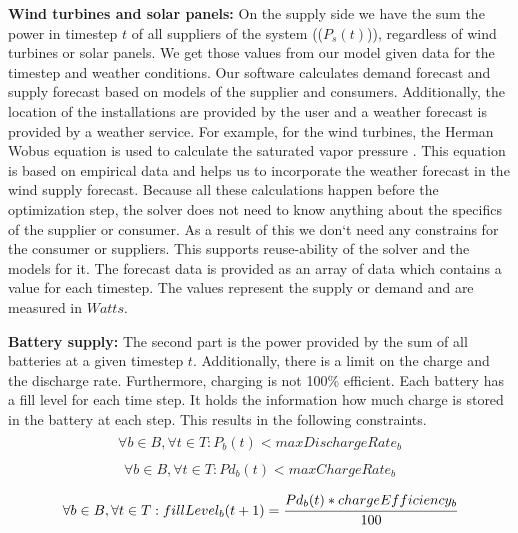 \textbf{Wind turbines and solar panels:} On the supply side we have the sum the power in timestep $t$ of all suppliers of the system (($P_{s}(t)$)), regardless of wind turbines or solar panels.
We get those values from our model given data for the timestep and weather conditions. 
Our software calculates demand forecast and supply forecast based on models of the supplier and consumers. 
Additionally, the location of the installations are provided by the user and a weather forecast is provided by a weather service. 
For example, for the wind turbines, the Herman Wobus equation is used to calculate the saturated vapor pressure \cite{NOAA}. 
This equation is based on empirical data and helps us to incorporate the weather forecast in the wind supply forecast. 
Because all these calculations happen before the optimization step, the solver does not need to know anything about the specifics of the supplier or consumer. As a result of this we don`t need any constrains for the consumer or suppliers. 
This supports reuse-ability of the solver and the models for it. 
The forecast data is provided as an array of data which contains a value for each timestep. 
The values represent the supply or demand and are measured in $Watts$.  %

\textbf{Battery supply:} The second part is the power provided by the sum of all batteries at a given timestep $t$. Additionally, there is a limit on the charge and the discharge rate. Furthermore, charging is not 100\% efficient. Each battery has a fill level for each time step. It holds the information how much charge is stored in the battery at each step. This results in the following constraints.
\begin{align} \label{eq:limitDischarge}
\begin{split}
\forall b \in B, \forall t \in T: P_{b}(t) < maxDischargeRate_{b}
\end{split}
\end{align}
\begin{align} \label{eq:limitCharge}
\begin{split}
\forall b \in B, \forall t \in T: Pd_{b}(t) < maxChargeRate_{b}
\end{split}
\end{align}
\begin{align} \label{eq:effi}
\begin{split}
\forall b \in B, \forall t \in T: fillLevel_{b}(t+1) = \cfrac{Pd_{b}(t)*chargeEfficiency_b}{100}
\end{split}
\end{align}

